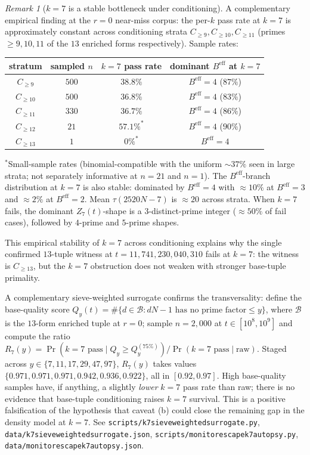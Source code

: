 \documentclass[11pt]{article}
\renewcommand{\_}{\origunderscore\allowbreak}
\theoremstyle{definition}
\theoremstyle{remark}
\newtheorem{remark}[theorem]{Remark}
\begin{document}
\begin{remark}[$k=7$ is a stable bottleneck under conditioning]\label{rem:k7_stable}
A complementary empirical finding at the $r=0$ near-miss corpus:
the per-$k$ pass rate at $k=7$ is approximately constant across
conditioning strata $C_{\ge 9}, C_{\ge 10}, C_{\ge 11}$ (primes~$\ge 9,
10, 11$ of the $13$ enriched forms respectively).  Sample rates:

\begin{center}
\begin{tabular}{c|ccc}
\hline
stratum & sampled $n$ & $k=7$ pass rate & dominant $B^{\mathrm{eff}}$ at $k=7$ \\
\hline
$C_{\ge 9}$  & $500$ & $38.8\%$ & $B^{\mathrm{eff}}=4$ ($87\%$) \\
$C_{\ge 10}$ & $500$ & $36.8\%$ & $B^{\mathrm{eff}}=4$ ($83\%$) \\
$C_{\ge 11}$ & $330$ & $36.7\%$ & $B^{\mathrm{eff}}=4$ ($86\%$) \\
$C_{\ge 12}$ & $21$  & $57.1\%^*$ & $B^{\mathrm{eff}}=4$ ($90\%$) \\
$C_{\ge 13}$ & $1$   & $0\%^*$  & $B^{\mathrm{eff}}=4$ \\
\hline
\end{tabular}
\end{center}

\noindent $^*$Small-sample rates (binomial-compatible with the
uniform $\sim 37\%$ seen in large strata; not separately informative
at $n=21$ and $n=1$).  The $B^{\mathrm{eff}}$-branch distribution at
$k=7$ is also stable: dominated by $B^{\mathrm{eff}}=4$ with $\approx
10\%$ at $B^{\mathrm{eff}}=3$ and $\approx 2\%$ at $B^{\mathrm{eff}}=2$.
Mean $\tau(2520N-7)$ is $\approx 20$ across strata.  When $k=7$ fails,
the dominant $Z_7(t)$-shape is a $3$-distinct-prime integer ($\approx
50\%$ of fail cases), followed by $4$-prime and $5$-prime shapes.

This empirical stability of $k=7$ across conditioning explains why
the single confirmed $13$-tuple witness at
$t=11{,}741{,}230{,}040{,}310$ fails at $k=7$: the witness is
$C_{\ge 13}$, but the $k=7$ obstruction does not weaken with
stronger base-tuple primality.

A complementary sieve-weighted surrogate confirms the transversality:
define the base-quality score
$Q_y(t) = \#\{d\in\mathcal B : dN-1\text{ has no prime factor}\le y\}$,
where $\mathcal B$ is the $13$-form enriched tuple at $r=0$; sample
$n=2{,}000$ at $t\in[10^8,10^9]$ and compute the ratio
$R_7(y) = \Pr(k=7\text{ pass}\mid Q_y\ge Q_y^{(75\%)})/
\Pr(k=7\text{ pass}\mid\text{raw})$.
Staged across $y\in\{7,11,17,29,47,97\}$, $R_7(y)$ takes values
$\{0.971, 0.971, 0.971, 0.942, 0.936, 0.922\}$, all in $[0.92, 0.97]$.
High base-quality samples have, if anything, a slightly \emph{lower}
$k=7$ pass rate than raw; there is no evidence that base-tuple
conditioning raises $k=7$ survival.  This is a positive
falsification of the hypothesis that caveat (b) could close the
remaining gap in the density model at $k=7$.  See
\texttt{scripts/k7\_sieve\_weighted\_surrogate.py},
\texttt{data/k7\_sieve\_weighted\_surrogate.json},
\texttt{scripts/monitor\_escape\_k7\_autopsy.py},
\texttt{data/monitor\_escape\_k7\_autopsy.json}.
\end{remark}
\end{document}
